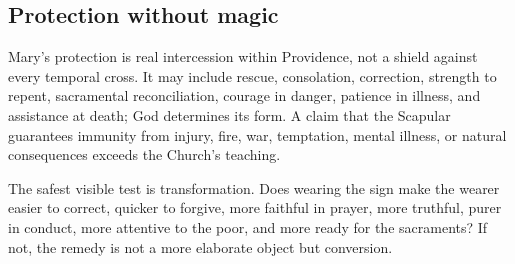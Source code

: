 \subsection{Protection without magic}

Mary's protection is real intercession within Providence, not a shield against every temporal cross. It may include rescue, consolation, correction, strength to repent, sacramental reconciliation, courage in danger, patience in illness, and assistance at death; God determines its form. A claim that the Scapular guarantees immunity from injury, fire, war, temptation, mental illness, or natural consequences exceeds the Church's teaching.

The safest visible test is transformation. Does wearing the sign make the wearer easier to correct, quicker to forgive, more faithful in prayer, more truthful, purer in conduct, more attentive to the poor, and more ready for the sacraments? If not, the remedy is not a more elaborate object but conversion.
